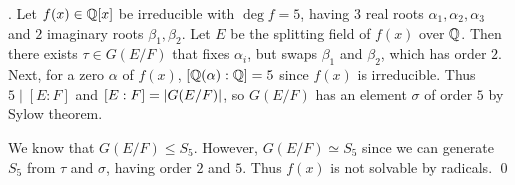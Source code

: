 \ex. Let \(f(x) \in \mathbb{Q}[x]\) be irreducible with \(\deg f = 5\), having \(3\) real roots \(\alpha_1, \alpha_2, \alpha_3\) and \(2\) imaginary roots \(\beta_1, \beta_2\). Let \(E\) be the splitting field of \(f(x)\) over \(\mathbb{Q}\). Then there exists \(\tau \in G(E/F)\) that fixes \(\alpha_i\), but swaps \(\beta_1\) and \(\beta_2\), which has order \(2\). Next, for a zero \(\alpha\) of \(f(x)\), \([\mathbb{Q}(\alpha) : \mathbb{Q}] = 5\) since \(f(x)\) is irreducible. Thus \(5 \mid [E : F]\) and \([E : F] = \left| G(E/F) \right|\), so \(G(E/F)\) has an element \(\sigma\) of order \(5\) by Sylow theorem.

We know that \(G(E/F) \leq S_5\). However, \(G(E/F) \simeq S_5\) since we can generate \(S_5\) from \(\tau\) and \(\sigma\), having order \(2\) and \(5\). Thus \(f(x)\) is not solvable by radicals. \qed

\pagebreak
